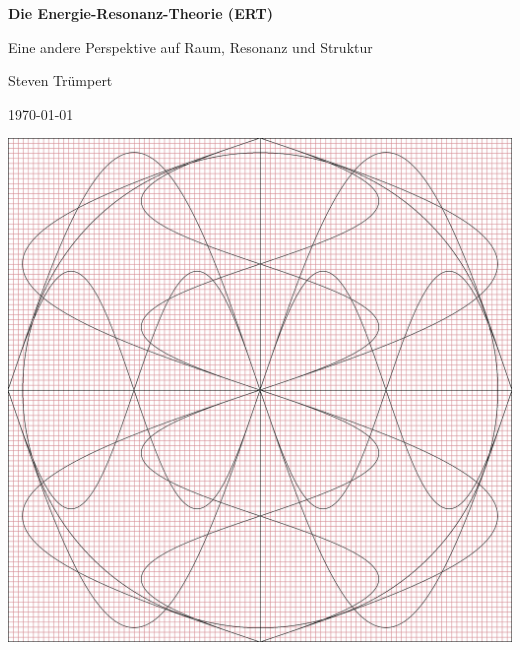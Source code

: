 \documentclass[12pt, a4paper, oneside, openany,DIV=16 headings=small]{scrbook}
\begin{document}
\begin{titlepage}
    \thispagestyle{empty}
    \centering
    {\LARGE\bfseries Die Energie-Resonanz-Theorie (ERT)\par}
     \vspace{0.3cm}
    {\large Eine andere Perspektive auf Raum, Resonanz und Struktur\par} 
    \vspace{1.2cm}
    {\Large Steven Trümpert\par}
    \vspace{0.6cm}
    {\large \today\par}
    \vspace{3.0cm}
    \includegraphics[width=.80\textwidth]{Front.jpg}
    \vfill
\end{titlepage}

\begin{abstract}

\end{abstract}
\tableofcontents

\mainmatter










\appendix

\end{document}
